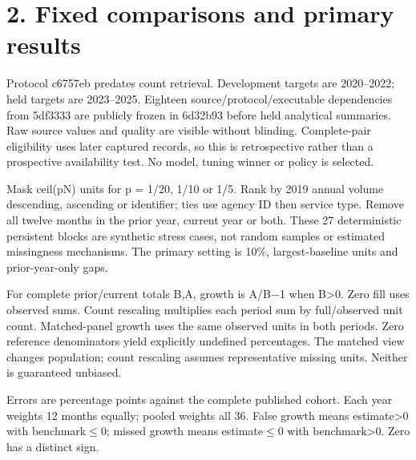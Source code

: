 \documentclass[11pt]{article}
\begin{document}
\newpage\section*{2. Fixed comparisons and primary results}
Protocol c6757eb predates count retrieval. Development targets are 2020--2022; held targets are 2023--2025. Eighteen source/protocol/executable dependencies from 5df3333 are publicly frozen in 6d32b93 before held analytical summaries. Raw source values and quality are visible without blinding. Complete-pair eligibility uses later captured records, so this is retrospective rather than a prospective availability test. No model, tuning winner or policy is selected.

Mask ceil(pN) units for p = 1/20, 1/10 or 1/5. Rank by 2019 annual volume descending, ascending or identifier; ties use agency ID then service type. Remove all twelve months in the prior year, current year or both. These 27 deterministic persistent blocks are synthetic stress cases, not random samples or estimated missingness mechanisms. The primary setting is 10\%, largest-baseline units and prior-year-only gaps.

For complete prior/current totals B,A, growth is A/B\ensuremath{-}1 when B>0. Zero fill uses observed sums. Count rescaling multiplies each period sum by full/observed unit count. Matched-panel growth uses the same observed units in both periods. Zero reference denominators yield explicitly undefined percentages. The matched view changes population; count rescaling assumes representative missing units. Neither is guaranteed unbiased.

Errors are percentage points against the complete published cohort. Each year weights 12 months equally; pooled weights all 36. False growth means estimate>0 with benchmark\ensuremath{\leq}0; missed growth means estimate\ensuremath{\leq}0 with benchmark>0. Zero has a distinct sign.
\end{document}
